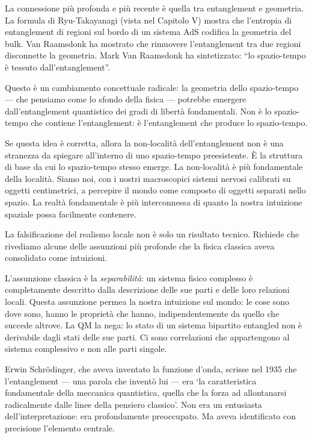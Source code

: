 \documentclass[12pt,a4paper,openany]{book}
\newcommand{\sezione}[1]{\vspace{1.2em}{\large\bfseries #1}\vspace{0.5em}\par}
\begin{document}
\sezione{Entanglement e struttura dello spazio-tempo}

La connessione più profonda e più recente è quella tra entanglement e geometria. La formula di Ryu-Takayanagi (vista nel Capitolo V) mostra che l'entropia di entanglement di regioni sul bordo di un sistema AdS codifica la geometria del bulk. Van Raamsdonk ha mostrato che rimuovere l'entanglement tra due regioni disconnette la geometria. Mark Van Raamsdonk ha sintetizzato: ``lo spazio-tempo è tessuto dall'entanglement''.

Questo è un cambiamento concettuale radicale: la geometria dello spazio-tempo --- che pensiamo come lo sfondo della fisica --- potrebbe emergere dall'entanglement quantistico dei gradi di libertà fondamentali. Non è lo spazio-tempo che contiene l'entanglement: è l'entanglement che produce lo spazio-tempo.

Se questa idea è corretta, allora la non-località dell'entanglement non è una stranezza da spiegare all'interno di uno spazio-tempo preesistente. È la struttura di base da cui lo spazio-tempo stesso emerge. La non-località è più fondamentale della località. Siamo noi, con i nostri macroscopici sistemi nervosi calibrati su oggetti centimetrici, a percepire il mondo come composto di oggetti separati nello spazio. La realtà fondamentale è più interconnessa di quanto la nostra intuizione spaziale possa facilmente contenere.

\sezione{Conseguenze filosofiche: verso un'ontologia dell'interconnessione}

La falsificazione del realismo locale non è solo un risultato tecnico. Richiede che rivediamo alcune delle assunzioni più profonde che la fisica classica aveva consolidato come intuizioni.

L'assunzione classica è la \textit{separabilità}: un sistema fisico complesso è completamente descritto dalla descrizione delle sue parti e delle loro relazioni locali. Questa assunzione permea la nostra intuizione sul mondo: le cose sono dove sono, hanno le proprietà che hanno, indipendentemente da quello che succede altrove. La QM la nega: lo stato di un sistema bipartito entangled non è derivabile dagli stati delle sue parti. Ci sono correlazioni che appartengono al sistema complessivo e non alle parti singole.

Erwin Schrödinger, che aveva inventato la funzione d'onda, scrisse nel 1935 che l'entanglement --- una parola che inventò lui --- era `la caratteristica fondamentale della meccanica quantistica, quella che la forza ad allontanarsi radicalmente dalle linee della pensiero classico'. Non era un entusiasta dell'interpretazione: era profondamente preoccupato. Ma aveva identificato con precisione l'elemento centrale.
\end{document}
